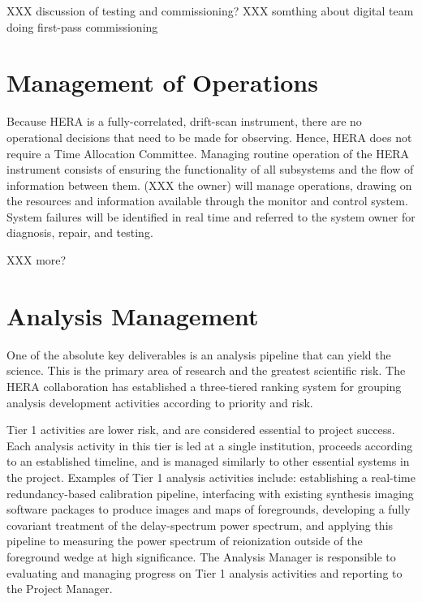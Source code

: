 \documentclass[preprint]{aastex}
\begin{document}
XXX discussion of testing and commissioning?
XXX somthing about digital team doing first-pass commissioning


\section{Management of Operations}
\label{sec:operations}

Because HERA is a fully-correlated, drift-scan instrument, there are no operational decisions
that need to be made for observing.  Hence, HERA does not require a Time Allocation Committee.
Managing routine operation of the HERA instrument consists of ensuring the functionality of all 
subsystems and the flow of information between them.  (XXX the owner) will manage operations, drawing on the resources and information
available through the monitor and control system.  System failures will be identified in real
time and referred to the system owner for diagnosis, repair, and testing.

XXX more?

\section{Analysis Management}
\label{sec:analysis}

One of the absolute key deliverables is an analysis pipeline that can yield the science.  This is the primary area of
research and the greatest scientific risk.  The HERA collaboration has established
a three-tiered ranking system for grouping analysis development activities according to priority and risk.

Tier 1 activities are lower risk, and are considered essential to project success.  Each analysis activity
in this tier is led at a single institution, proceeds according to an established timeline, and is managed
similarly to other essential systems in the project.  Examples of Tier 1 analysis activities include:
establishing a real-time redundancy-based calibration pipeline, interfacing with existing synthesis imaging
software packages to produce images and maps of foregrounds, developing a fully covariant treatment of
the delay-spectrum power spectrum, and applying this pipeline to measuring the power spectrum of reionization
outside of the foreground wedge at high significance.
The Analysis Manager is responsible to evaluating
and managing progress on Tier 1 analysis activities and reporting to the Project Manager.
\end{document}
